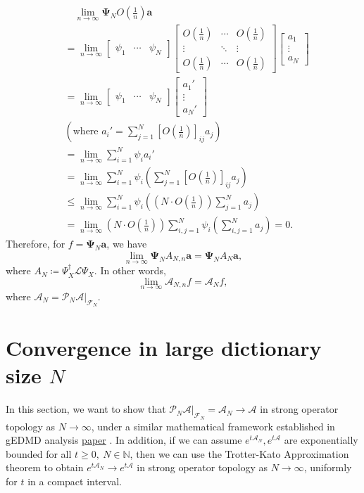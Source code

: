 \documentclass{article}[11]
\begin{document}
\begin{align*}
	&\quad \lim_{n\to\infty} \mathbf{\Psi}_N O(\tfrac{1}{n})\mathbf{a} \\
	&= \lim_{n\to\infty} 
	\begin{bmatrix}
		\psi_1 & \cdots & \psi_N
	\end{bmatrix}
	\begin{bmatrix}
		O(\tfrac{1}{n}) & \cdots & O(\tfrac{1}{n}) \\
		\vdots & \ddots & \vdots \\
		O(\tfrac{1}{n}) & \cdots & O(\tfrac{1}{n})
	\end{bmatrix}
	\begin{bmatrix}
		a_1 \\
		\vdots \\
		a_N
	\end{bmatrix} \\
	&= \lim_{n\to\infty} 
	\begin{bmatrix}
		\psi_1 & \cdots & \psi_N
	\end{bmatrix}
	\begin{bmatrix}
		a_1' \\
		\vdots \\
		a_N'
	\end{bmatrix} \\
	&(\text{where $a_i'=\sum_{j=1}^N [O(\tfrac{1}{n})]_{ij}a_j$}) \\
	&= \lim_{n\to\infty} \sum_{i=1}^N \psi_i a_i' \\
	&= \lim_{n\to\infty} \sum_{i=1}^N \psi_i \left( \sum_{j=1}^N [O(\tfrac{1}{n})]_{ij}a_j \right) \\
	&\leq \lim_{n\to\infty} \sum_{i=1}^N \psi_i \left( \left(N \cdot O(\tfrac{1}{n})\right) \sum_{j=1}^N a_j \right) \\
	&= \lim_{n\to\infty} \left(N \cdot O(\tfrac{1}{n})\right) \sum_{i,j=1}^N \psi_i \left( \sum_{i,j=1}^N a_j \right) = 0.
\end{align*}
Therefore, for $f=\mathbf{\Psi}_N\mathbf{a}$, we have
$$
\lim_{n\to\infty} \mathbf{\Psi}_N A_{N,n} \mathbf{a} = \mathbf{\Psi}_N A_N \mathbf{a},
$$ 
where $A_N \coloneqq \Psi_X^{\dagger}\mathcal{L}\Psi_X$. In other words,
$$
\lim_{n\to\infty} \mathcal{A}_{N,n} f = \mathcal{A}_N f,
$$
where $\mathcal{A}_N = \mathcal{P}_N \mathcal{A}|_{\mathcal{F}_N}$.




\newpage
\section{Convergence in large dictionary size $N$}
In this section, we want to show that $\mathcal{P}_N\mathcal{A}|_{\mathcal{F}_N} = \mathcal{A}_N \to \mathcal{A}$ in strong operator topology as $N \to \infty$, under a similar mathematical framework established in gEDMD analysis \href{https://arxiv.org/abs/2405.00539}{paper} . In addition, if we can assume $e^{t\mathcal{A}_N}, e^{t\mathcal{A}}$ are exponentially bounded for all $t\geq 0, \ N\in\mathbb{N}$, then we can use the Trotter-Kato Approximation theorem to obtain $e^{t\mathcal{A}_N} \to e^{t\mathcal{A}}$ in strong operator topology as $N \to \infty$, uniformly for $t$ in a compact interval.
\end{document}
